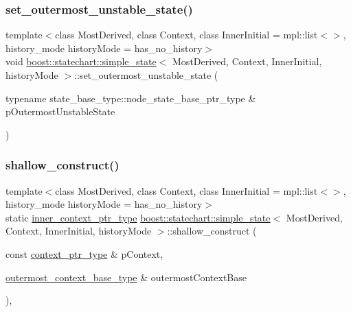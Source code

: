 \subsubsection{\texorpdfstring{set\+\_\+outermost\+\_\+unstable\+\_\+state()}{set\_outermost\_unstable\_state()}}
{\footnotesize\ttfamily template$<$class Most\+Derived, class Context, class Inner\+Initial = mpl\+::list$<$$>$, history\+\_\+mode history\+Mode = has\+\_\+no\+\_\+history$>$ \\
void \mbox{\hyperlink{classboost_1_1statechart_1_1simple__state}{boost\+::statechart\+::simple\+\_\+state}}$<$ Most\+Derived, Context, Inner\+Initial, history\+Mode $>$\+::set\+\_\+outermost\+\_\+unstable\+\_\+state (\begin{DoxyParamCaption}\item[{typename state\+\_\+base\+\_\+type\+::node\+\_\+state\+\_\+base\+\_\+ptr\+\_\+type \&}]{p\+Outermost\+Unstable\+State }\end{DoxyParamCaption})\hspace{0.3cm}{\ttfamily [inline]}}

\mbox{\label{classboost_1_1statechart_1_1simple__state_a598d677d3cf6b90001e19ef3566eca5e}} 
\subsubsection{\texorpdfstring{shallow\+\_\+construct()}{shallow\_construct()}}
{\footnotesize\ttfamily template$<$class Most\+Derived, class Context, class Inner\+Initial = mpl\+::list$<$$>$, history\+\_\+mode history\+Mode = has\+\_\+no\+\_\+history$>$ \\
static \mbox{\hyperlink{classboost_1_1statechart_1_1simple__state_ad6d3233a11a23e91b4cc9edcae799379}{inner\+\_\+context\+\_\+ptr\+\_\+type}} \mbox{\hyperlink{classboost_1_1statechart_1_1simple__state}{boost\+::statechart\+::simple\+\_\+state}}$<$ Most\+Derived, Context, Inner\+Initial, history\+Mode $>$\+::shallow\+\_\+construct (\begin{DoxyParamCaption}\item[{const \mbox{\hyperlink{classboost_1_1statechart_1_1simple__state_ac7e361322d53b3f57976ff23056b59e7}{context\+\_\+ptr\+\_\+type}} \&}]{p\+Context,  }\item[{\mbox{\hyperlink{classboost_1_1statechart_1_1simple__state_a50f21d7a7d6632eb34430e74cbad3197}{outermost\+\_\+context\+\_\+base\+\_\+type}} \&}]{outermost\+Context\+Base }\end{DoxyParamCaption})\hspace{0.3cm}{\ttfamily [inline]}, {\ttfamily [static]}}

